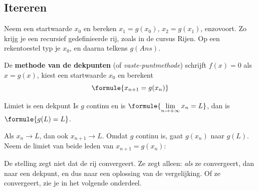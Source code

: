 \subsection{Itereren}

Neem een startwaarde $x_0$ en bereken $x_1 = g(x_0)$, $x_2 = g(x_1)$, enzovoort. Zo krijg je een recursief gedefinieerde rij, zoals in de cursus Rijen. Op een rekentoestel typ je $x_0$, en daarna telkens $g(\textit{Ans})$.

\begin{theorie}
De \textbf{\textcolor{accent}{methode van de dekpunten}} (of \textit{vaste-puntmethode}) schrijft $f(x) = 0$ als $x = g(x)$, kiest een startwaarde $x_0$ en berekent
\[
\formule{x_{n+1} = g(x_n)}
\]
\begin{stelling}{Limiet is een dekpunt}
Is $g$ continu en is $\formule{\lim\limits_{n \to +\infty} x_n = L}$, dan is $\formule{g(L) = L}$.
\end{stelling}

\begin{bewijs}
Als $x_n \to L$, dan ook $x_{n+1} \to L$. Omdat $g$ continu is, gaat $g(x_n)$ naar $g(L)$. Neem de limiet van beide leden van $x_{n+1} = g(x_n)$:
\end{bewijs}
\end{theorie}

De stelling zegt niet dat de rij convergeert. Ze zegt alleen: \textit{als} ze convergeert, dan naar een dekpunt, en dus naar een oplossing van de vergelijking. Of ze convergeert, zie je in het volgende onderdeel.

